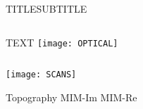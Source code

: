 \begin{frame}{TITLE}{SUBTITLE}
\begin{columns}
TEXT
 \texttt{[image: OPTICAL]}\\
 \end{columns}

\begin{center}
  \texttt{[image: SCANS]} \\
     \end{center}
\hspace{.5cm} Topography \hspace{2.5cm} MIM-Im \hspace{2.3cm} MIM-Re
\end{frame}